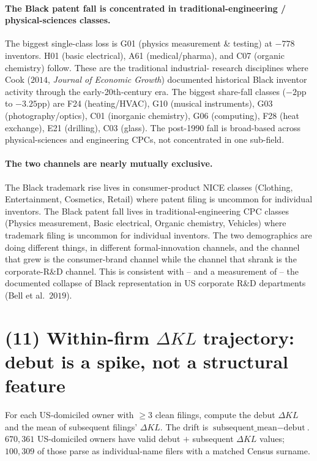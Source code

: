 \documentclass[11pt]{article}
\begin{document}
\paragraph{The Black patent fall is concentrated in
traditional-engineering / physical-sciences classes.} The biggest
single-class loss is G01 (physics measurement \& testing) at $-778$
inventors. H01 (basic electrical), A61 (medical/pharma), and C07
(organic chemistry) follow. These are the traditional industrial-
research disciplines where Cook ($2014$, \emph{Journal of
Economic Growth}) documented historical Black inventor activity
through the early-20th-century era. The biggest share-fall classes
($-2$pp to $-3.25$pp) are F24 (heating/HVAC), G10 (musical
instruments), G03 (photography/optics), C01 (inorganic chemistry),
G06 (computing), F28 (heat exchange), E21 (drilling), C03 (glass).
The post-1990 fall is broad-based across physical-sciences and
engineering CPCs, not concentrated in one sub-field.

\paragraph{The two channels are nearly mutually exclusive.} The
Black trademark rise lives in consumer-product NICE classes
(Clothing, Entertainment, Cosmetics, Retail) where patent filing
is uncommon for individual inventors. The Black patent fall lives
in traditional-engineering CPC classes (Physics measurement,
Basic electrical, Organic chemistry, Vehicles) where trademark
filing is uncommon for individual inventors. The two demographics
are doing different things, in different formal-innovation
channels, and the channel that grew is the consumer-brand channel
while the channel that shrank is the corporate-R\&D channel. This
is consistent with -- and a measurement of -- the documented
collapse of Black representation in US corporate R\&D departments
(Bell et al.\ $2019$).

\section*{(11) Within-firm $\Delta KL$ trajectory: debut is a spike, not a structural feature}

For each US-domiciled owner with $\geq 3$ clean filings, compute
the debut $\Delta KL$ and the mean of subsequent filings'
$\Delta KL$. The drift is $\text{subsequent\_mean} - \text{debut}$.
$670{,}361$ US-domiciled owners have valid debut $+$ subsequent
$\Delta KL$ values; $100{,}309$ of those parse as individual-name
filers with a matched Census surname.
\end{document}

